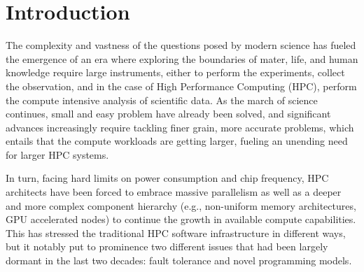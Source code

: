 \documentclass[sigconf]{acmart}
\begin{document}

%

%
\maketitle

\section{Introduction}\label{sec:intro}

The complexity and vastness of the questions posed by modern science has
fueled the emergence of an era where exploring the boundaries of mater, life,
and human knowledge require large instruments, either to perform the
experiments, collect the observation, and in the
case of High Performance Computing (HPC), perform the compute intensive
analysis of scientific data. As the march of science continues, small and
easy problem have already been solved, and significant advances increasingly
require tackling finer grain, more accurate problems, which entails that the
compute workloads are getting larger, fueling an unending need for larger
HPC systems.

In turn, facing hard limits on power consumption and chip frequency,
HPC architects have been forced to embrace massive parallelism as well as
a deeper and more complex component hierarchy (e.g., non-uniform memory architectures,
GPU accelerated nodes) to continue the growth in available compute capabilities.
This has stressed the traditional HPC software infrastructure in different 
ways, but it notably put to prominence two different issues that had been 
largely dormant in the last two decades: fault tolerance and novel programming 
models.
\end{document}
